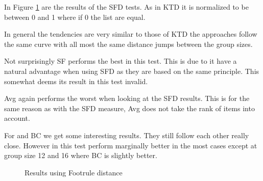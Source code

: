 In Figure \ref{fig:footruledistance} are the results of the SFD tests. As in KTD it is normalized to be between 0 and 1 where if 0 the list are equal.

In general the tendencies are very similar to those of KTD the approaches follow the same curve with all most the same distance jumps between the group sizes.

Not surprisingly SF performs the best in this test. This is due to it have a natural advantage when using SFD as they are based on the same principle. This somewhat deems its result in this test invalid.

Avg again performs the worst when looking at the SFD results. This is for the same reason as with the SFD measure, Avg does not take the rank of items into account.

For \MC and BC we get some interesting results. They still follow each other really close. However in this test \MC perform marginally better in the most cases except at group size 12 and 16 where BC is slightly better.

\begin{figure}[H]
\caption{Results using Footrule distance} \label{fig:footruledistance}
\end{figure}

